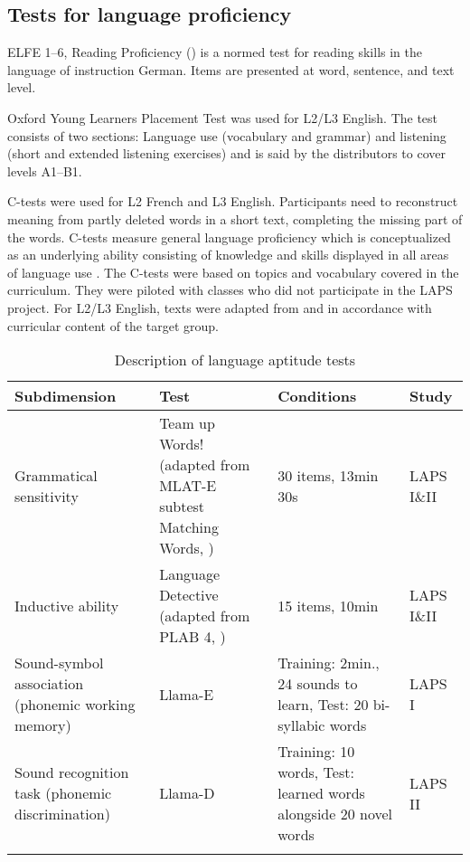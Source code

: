 \documentclass[output=paper]{langsci/langscibook}
\begin{document}
\subsection{Tests for language proficiency}
ELFE 1--6, Reading Proficiency (\citealt{LenhardSchneider2006}) is a normed test for reading skills in the language of instruction German. Items are presented at word, sentence, and text level.\largerpage

Oxford Young Learners Placement Test \citep{Testing2013} was used for L2/L3 English. The test consists of two sections: Language use (vocabulary and grammar) and listening (short and extended listening exercises) and is said by the distributors to cover levels A1--B1.

C-tests were used for L2 French and L3 English. Participants need to reconstruct meaning from partly deleted words in a short text, completing the missing part of the words. C-tests measure general language proficiency which is conceptualized as an underlying ability consisting of knowledge and skills displayed in all areas of language use \citep{EckesGrotjahn2006}. The C-tests were based on topics and vocabulary covered in the curriculum. They were piloted with classes who did not participate in the LAPS project. For L2/L3 English, texts were adapted from \citet{BabaiiShahri2010} and \citet{WildenPorsch2017} in accordance with curricular content of the target group.

\begin{table}[p]\footnotesize
\begin{tabularx}{\textwidth}{QQQl}
\lsptoprule
{Subdimension} & {Test} & {Conditions} & {Study}\\\midrule
Grammatical sensitivity & Team up Words! (adapted from MLAT-E subtest Matching Words, \citealt{CarrollSapon2010}) & 30 items, 13min 30s & LAPS I\&II\\
Inductive ability & Language Detective (adapted from PLAB 4, \citealt{PimsleurEtAl2004}) & 15 items, 10min & LAPS I\&II\\
Sound-symbol association (phonemic working memory) & Llama-E \citep{MearaEtAl2001} & Training: 2min., 24 sounds to learn, Test: 20 bi-syllabic words & LAPS I\\
Sound recognition task (phonemic discrimination) & Llama-D \citep{MearaEtAl2001} & Training: 10 words, Test: learned words alongside 20 novel words & LAPS II\\
\lspbottomrule
\end{tabularx}
\caption{Description of language aptitude tests\label{tab:tests:part-1}}
\end{table}
\end{document}
